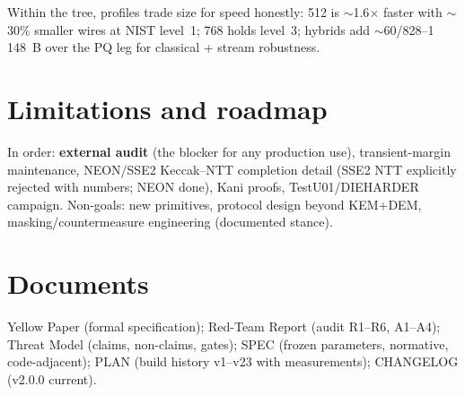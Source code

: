 \documentclass[11pt,a4paper]{article}
\begin{document}
Within the tree, profiles trade size for speed honestly: 512 is $\sim$1.6$\times$
faster with $\sim$30\% smaller wires at NIST level~1; 768 holds level~3; hybrids add
$\sim$60/828--1\,148~B over the PQ leg for classical + stream robustness.

\section{Limitations and roadmap}

In order: \textbf{external audit} (the blocker for any production use),
transient-margin maintenance, NEON/SSE2 Keccak--NTT completion detail (SSE2 NTT
explicitly rejected with numbers; NEON done), Kani proofs, TestU01/DIEHARDER
campaign. Non-goals: new primitives, protocol design beyond KEM+DEM,
masking/countermeasure engineering (documented stance).

\section{Documents}

Yellow Paper (formal specification); Red-Team Report (audit R1--R6, A1--A4); Threat
Model (claims, non-claims, gates); SPEC (frozen parameters, normative,
code-adjacent); PLAN (build history v1--v23 with measurements); CHANGELOG
(v2.0.0 current).
\end{document}
